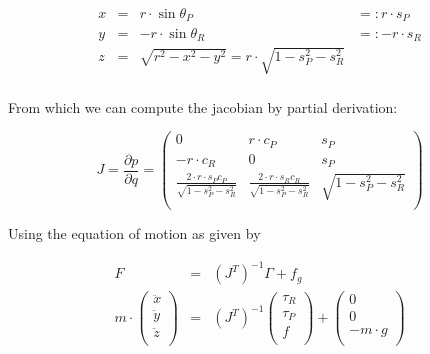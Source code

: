 \documentclass[english,ngerman]{KITreprt}
\begin{document}
\begin{equation}
\begin{array}{lcll} \label{eq:lip-xyz}
x & = & r \cdot \sin \theta_P & =: r \cdot s_P\\
y & = & -r \cdot \sin \theta_R & =: -r \cdot s_R \\
z & = & \sqrt{r^2 - x^2 - y^2} = r \cdot \sqrt{1 - s_P^2 - s_R^2} & \\
\end{array}
\end{equation}

From which we can compute the jacobian by partial derivation:

\begin{equation} \label{eq:lip-jacobian}
J = \frac{\partial p}{\partial q} = \left( \begin{array}{rcl}
0 & r \cdot c_P & s_P \\
-r \cdot c_R & 0 & s_P \\
\frac{2 \cdot r \cdot s_P c_P}{\sqrt{1 - s_P^2 - s_R^2}} & \frac{2 \cdot r \cdot s_R c_R}{\sqrt{1 - s_P^2 - s_R^2}} & \sqrt{1 - s_P^2 - s_R^2}\\
\end{array}
\right)
\end{equation}

Using the equation of motion as given by

\begin{equation}
\begin{array}{lcr}
F & = & (J^T)^{-1} \Gamma + f_g \\
m \cdot
\left(\begin{array}{c}
\ddot x \\
\ddot y \\
\ddot z \\
\end{array}\right)
& = & (J^T)^{-1}
\left(\begin{array}{c}
\tau_R \\
\tau_P \\
f \\
\end{array}\right)
+
\left(\begin{array}{c}
0 \\
0 \\
-m \cdot g \\
\end{array}\right) \\
\end{array}
\end{equation}
\end{document}
